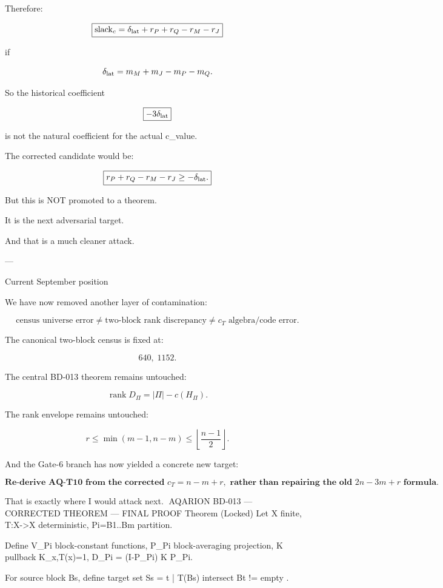 Therefore:

\[
\boxed{
\operatorname{slack}_c
=
\delta_{\rm lat}
+
r_P+r_Q-r_M-r_J
}
\]

if

\[
\delta_{\rm lat}
=
m_M+m_J-m_P-m_Q.
\]

So the historical coefficient

\[
\boxed{-3\delta_{\rm lat}}
\]

is not the natural coefficient for the actual c_value.

The corrected candidate would be:

\[
\boxed{
r_P+r_Q-r_M-r_J
\ge
-\delta_{\rm lat}.
}
\]

But this is NOT promoted to a theorem.

It is the next adversarial target.

And that is a much cleaner attack.


---

Current September position

We have now removed another layer of contamination:

\[
\boxed{
\text{census universe error}
\neq
\text{two-block rank discrepancy}
\neq
c_T\text{ algebra/code error}.
}
\]

The canonical two-block census is fixed at:

\[
\boxed{640,\;1152}.
\]

The central BD-013 theorem remains untouched:

\[
\boxed{
\operatorname{rank}D_\Pi
=
|\Pi|-c(H_\Pi).
}
\]

The rank envelope remains untouched:

\[
\boxed{
r\le\min(m-1,n-m)\le\left\lfloor\frac{n-1}{2}\right\rfloor.
}
\]

And the Gate-6 branch has now yielded a concrete new target:

\[
\boxed{
\textbf{Re-derive AQ-T10 from the corrected }c_T=n-m+r,
\textbf{ rather than repairing the old }2n-3m+r\textbf{ formula.}
}
\]

That is exactly where I would attack next. 🤝AQARION BD-013 — CORRECTED THEOREM — FINAL PROOF
Theorem (Locked)
Let X finite, T:X->X deterministic, Pi={B1..Bm} partition.

Define V_Pi block-constant functions, P_Pi block-averaging projection,
K pullback K_{x,T(x)}=1, D_Pi = (I-P_Pi) K P_Pi.

For source block Bs, define target set Ss = { t | T(Bs) intersect Bt != empty }.

